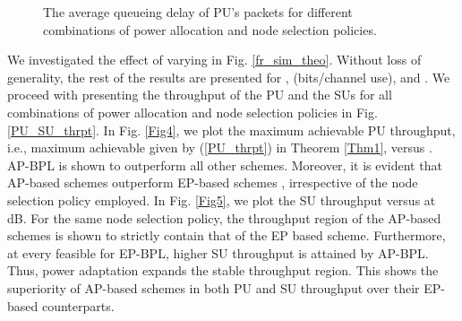 \documentclass[journal,twocolumn]{IEEEtran}
\begin{document}
\begin{figure*}[t]
 \centering
 \caption{The average queueing delay of PU's packets for different combinations of power allocation and node selection policies.}
 \label{PU_delay}
  \vspace{-3mm}
\end{figure*}

We investigated the effect of varying  in Fig. \ref{fr_sim_theo}. Without loss of generality, the rest of the results are presented for ,  (bits/channel use), and . We proceed with presenting the throughput of the PU and the SUs for all combinations of power allocation and node selection policies in Fig. \ref{PU_SU_thrpt}. In Fig. \ref{Fig4}, we plot the maximum achievable PU throughput, i.e., maximum achievable  given by (\ref{PU_thrpt}) in Theorem \ref{Thm1}, versus . AP-BPL is shown to outperform all other schemes. Moreover, it is evident that AP-based schemes outperform EP-based schemes \cite{Krikidis}, irrespective of the node selection policy employed. In Fig. \ref{Fig5}, we plot the SU throughput versus  at  dB. For the same node selection policy, the throughput region of the AP-based schemes is shown to strictly contain that of the EP based scheme. Furthermore, at every feasible  for EP-BPL, higher SU throughput is attained by AP-BPL. Thus, power adaptation expands the stable throughput region. This shows the superiority of AP-based schemes in both PU and SU throughput over their EP-based counterparts.
\end{document}
